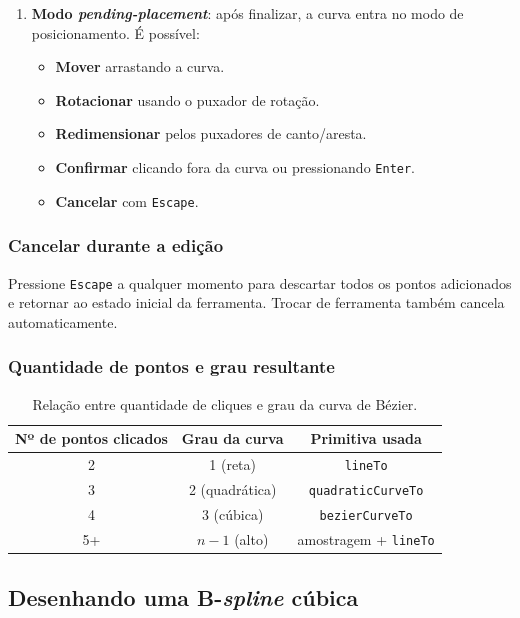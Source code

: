 \documentclass[12pt, a4paper]{article}
\theoremstyle{remark}
\newcommand{\code}[1]{\texttt{#1}}
\begin{document}
\begin{enumerate}[leftmargin=1.6cm, label=\textbf{Passo \arabic*.}]
    \item \textbf{Modo \emph{pending-placement}}: após finalizar, a curva entra
          no modo de posicionamento. É possível:
          \begin{itemize}
              \item \textbf{Mover} arrastando a curva.
              \item \textbf{Rotacionar} usando o puxador de rotação.
              \item \textbf{Redimensionar} pelos puxadores de canto/aresta.
              \item \textbf{Confirmar} clicando fora da curva ou pressionando
                    \texttt{Enter}.
              \item \textbf{Cancelar} com \texttt{Escape}.
          \end{itemize}

\end{enumerate}

\subsubsection*{Cancelar durante a edição}

Pressione \texttt{Escape} a qualquer momento para descartar todos os pontos
adicionados e retornar ao estado inicial da ferramenta.
Trocar de ferramenta também cancela automaticamente.

\subsubsection*{Quantidade de pontos e grau resultante}

\begin{table}[H]
\centering
\begin{tabular}{ccc}
\toprule
\textbf{Nº de pontos clicados} & \textbf{Grau da curva} & \textbf{Primitiva usada} \\
\midrule
2 & 1 (reta) & \code{lineTo} \\
3 & 2 (quadrática) & \code{quadraticCurveTo} \\
4 & 3 (cúbica) & \code{bezierCurveTo} \\
5+ & $n-1$ (alto) & amostragem + \code{lineTo} \\
\bottomrule
\end{tabular}
\caption{Relação entre quantidade de cliques e grau da curva de Bézier.}
\end{table}

\subsection{Desenhando uma B-\emph{spline} cúbica}
\end{document}
